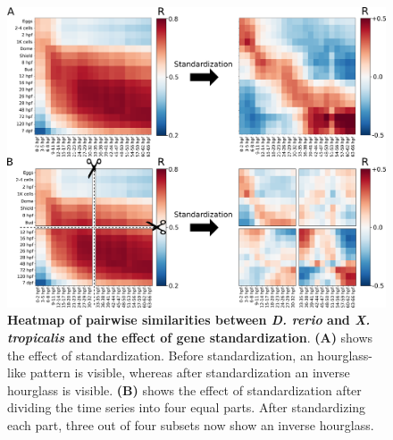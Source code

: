 \begin{figure}[H]
    \includegraphics[width=\linewidth]{ch.hourglass/images/normalisation.png}
    \caption{\textbf{Heatmap of pairwise similarities between \textit{D. rerio} and \textit{X. tropicalis} and the effect of gene standardization}. \textbf{(A)} shows the effect of standardization. Before standardization, an hourglass-like pattern is visible, whereas after standardization an inverse hourglass is visible. \textbf{(B)} shows the effect of standardization after dividing the time series into four equal parts. After standardizing each part, three out of four subsets now show an inverse hourglass. }
    \label{fig:standardization}
\end{figure}

